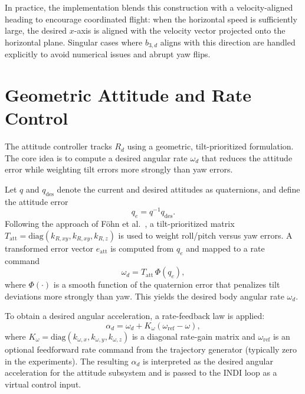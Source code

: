 In practice, the implementation blends this construction with a velocity-aligned
heading to encourage coordinated flight: when the horizontal speed is
sufficiently large, the desired $x$-axis is aligned with the velocity vector
projected onto the horizontal plane. Singular cases where $b_{3,d}$ aligns with
this direction are handled explicitly to avoid numerical issues and abrupt yaw
flips.

\section{Geometric Attitude and Rate Control}

The attitude controller tracks $R_d$ using a geometric, tilt-prioritized
formulation. The core idea is to compute a desired angular rate $\omega_d$ that
reduces the attitude error while weighting tilt errors more strongly than yaw
errors.

Let $q$ and $q_{\mathrm{des}}$ denote the current and desired attitudes as
quaternions, and define the attitude error
\begin{equation}
    q_e = q^{-1} q_{\mathrm{des}}.
\end{equation}
Following the approach of F\"ohn et al.~\cite{Foehn2020}, a tilt-prioritized
matrix $T_{\mathrm{att}} = \mathrm{diag}(k_{R,xy}, k_{R,xy}, k_{R,z})$ is used to
weight roll/pitch versus yaw errors. A transformed error vector $e_{\mathrm{att}}$
is computed from $q_e$ and mapped to a rate command
\begin{equation}
    \omega_d = T_{\mathrm{att}}\,\Phi(q_e),
\end{equation}
where $\Phi(\cdot)$ is a smooth function of the quaternion error that penalizes
tilt deviations more strongly than yaw. This yields the desired body angular
rate $\omega_d$.

To obtain a desired angular acceleration, a rate-feedback law is applied:
\begin{equation}
    \alpha_d = \omega_d + K_\omega (\omega_{\mathrm{ref}} - \omega),
\end{equation}
where $K_\omega = \mathrm{diag}(k_{\omega,x}, k_{\omega,y}, k_{\omega,z})$ is a
diagonal rate-gain matrix and $\omega_{\mathrm{ref}}$ is an optional feedforward
rate command from the trajectory generator (typically zero in the experiments).
The resulting $\alpha_d$ is interpreted as the desired angular acceleration for
the attitude subsystem and is passed to the INDI loop as a virtual control input.


